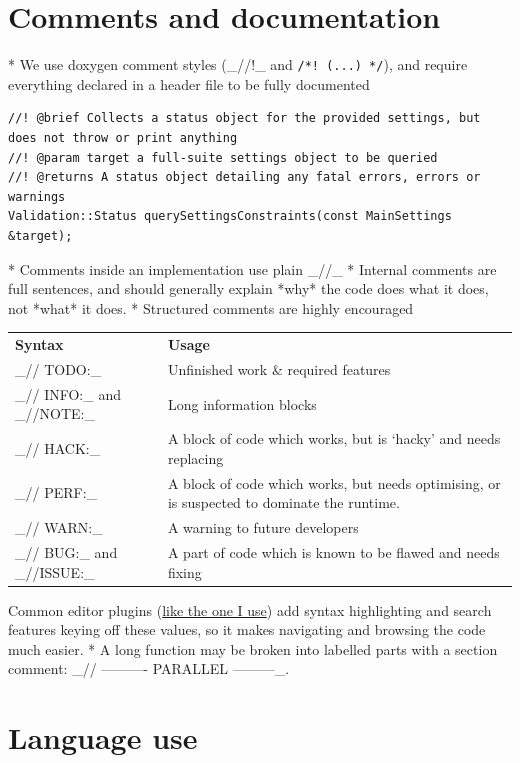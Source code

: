 \section{Comments and documentation}

	* We use doxygen comment styles (_//!_ and \texttt{/*! (...) */}), and require everything declared in a header file to be fully documented

	\begin{lstlisting}
//! @brief Collects a status object for the provided settings, but does not throw or print anything
//! @param target a full-suite settings object to be queried
//! @returns A status object detailing any fatal errors, errors or warnings
Validation::Status querySettingsConstraints(const MainSettings &target);
\end{lstlisting}
	* Comments inside an implementation use plain _//_
	* Internal comments are full sentences, and should generally explain *why* the code does what it does, not *what* it does.
	* Structured comments are highly encouraged\par
	\begin{tabularx}{\linewidth}{lX}
		\bf Syntax               & \bf Usage
		\\
		_// TODO:_               & Unfinished work \& required features
		\\
		_// INFO:_ and _//NOTE:_ & Long information blocks
		\\
		_// HACK:_               & A block of code which works, but is `hacky' and needs replacing
		\\
		_// PERF:_               & A block of code which works, but needs optimising, or is suspected to dominate the runtime.
		\\
		_// WARN:_               & A warning to future developers
		\\
		_// BUG:_ and _//ISSUE:_ & A part of code which is known to be flawed and needs fixing
	\end{tabularx}
	Common editor plugins (\href{https://github.com/folke/todo-comments.nvim}{like the one I use}) add syntax highlighting and search features keying off these values, so it makes navigating and browsing the code much easier.
	* A long function may be broken into labelled parts with a section comment: _// ---------- PARALLEL ---------_.


\section{Language use}


